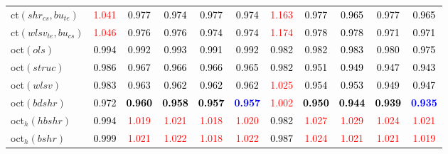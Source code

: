 \begin{tabular}[t]{l|>{}cccc>{}c|ccccc}
ct$(shr_{cs}, bu_{te})$ & \textcolor{red}{1.041} & \textcolor{black}{0.977} & \textcolor{black}{0.974} & \textcolor{black}{0.977} & \textcolor{black}{0.974} & \textcolor{red}{1.163} & \textcolor{black}{0.977} & \textcolor{black}{0.965} & \textcolor{black}{0.977} & \textcolor{black}{0.965}\\
ct$(wlsv_{te}, bu_{cs})$ & \textcolor{red}{1.046} & \textcolor{black}{0.976} & \textcolor{black}{0.976} & \textcolor{black}{0.974} & \textcolor{black}{0.974} & \textcolor{red}{1.174} & \textcolor{black}{0.978} & \textcolor{black}{0.978} & \textcolor{black}{0.971} & \textcolor{black}{0.971}\\
oct$(ols)$ & \textcolor{black}{0.994} & \textcolor{black}{0.992} & \textcolor{black}{0.993} & \textcolor{black}{0.991} & \textcolor{black}{0.992} & \textcolor{black}{0.982} & \textcolor{black}{0.982} & \textcolor{black}{0.983} & \textcolor{black}{0.980} & \textcolor{black}{0.975}\\
oct$(struc)$ & \textcolor{black}{0.986} & \textcolor{black}{0.967} & \textcolor{black}{0.966} & \textcolor{black}{0.966} & \textcolor{black}{0.965} & \textcolor{black}{0.982} & \textcolor{black}{0.951} & \textcolor{black}{0.949} & \textcolor{black}{0.947} & \textcolor{black}{0.943}\\
oct$(wlsv)$ & \textcolor{black}{0.983} & \textcolor{black}{0.963} & \textcolor{black}{0.962} & \textcolor{black}{0.962} & \textcolor{black}{0.962} & \textcolor{red}{1.025} & \textcolor{black}{0.954} & \textcolor{black}{0.953} & \textcolor{black}{0.949} & \textcolor{black}{0.947}\\
oct$(bdshr)$ & \textcolor{black}{0.972} & \textcolor{black}{\textbf{0.960}} & \textcolor{black}{\textbf{0.958}} & \textcolor{black}{\textbf{0.957}} & \textcolor{blue}{\textbf{0.957}} & \textcolor{red}{1.002} & \textcolor{black}{\textbf{0.950}} & \textcolor{black}{\textbf{0.944}} & \textcolor{black}{\textbf{0.939}} & \textcolor{blue}{\textbf{0.935}}\\
oct$_h(hbshr)$ & \textcolor{black}{0.994} & \textcolor{red}{1.019} & \textcolor{red}{1.021} & \textcolor{red}{1.018} & \textcolor{red}{1.020} & \textcolor{black}{0.982} & \textcolor{red}{1.027} & \textcolor{red}{1.029} & \textcolor{red}{1.024} & \textcolor{red}{1.021}\\
oct$_h(bshr)$ & \textcolor{black}{0.999} & \textcolor{red}{1.021} & \textcolor{red}{1.022} & \textcolor{red}{1.018} & \textcolor{red}{1.022} & \textcolor{black}{0.987} & \textcolor{red}{1.024} & \textcolor{red}{1.021} & \textcolor{red}{1.021} & \textcolor{red}{1.019}\\

\end{tabular}
